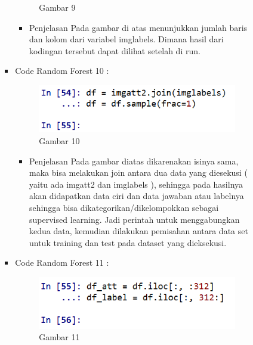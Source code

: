 \begin{enumerate}
\begin{itemize}
\begin{itemize}
\begin{itemize}
\begin{figure}[ht]
\caption{Gambar 9}
\label{contoh}
\end{figure}
\par
\begin{itemize}
\item Penjelasan  Pada gambar di atas menunjukkan jumlah baris dan kolom dari variabel imglabels. Dimana hasil dari kodingan tersebut dapat dilihat setelah di run. 
\par
\par
\end{itemize}
\item Code Random Forest 10 :
\par
\begin{figure}[ht]
\centering
\includegraphics[scale=0.7]{figures/andi/RF10.PNG}
\caption{Gambar 10}
\label{contoh}
\end{figure}
\par
\begin{itemize}
\item Penjelasan  Pada gambar diatas dikarenakan isinya sama, maka bisa melakukan join antara dua data yang diesekusi ( yaitu ada imgatt2 dan imglabels ), sehingga pada hasilnya akan didapatkan data ciri dan data jawaban atau labelnya sehingga bisa dikategorikan/dikelompokkan sebagai supervised learning. Jadi perintah untuk menggabungkan kedua data, kemudian dilakukan pemisahan antara data set untuk training dan test pada dataset yang dieksekusi.
\par
\par
\end{itemize}
\item Code Random Forest 11 :
\par
\begin{figure}[ht]
\centering
\includegraphics[scale=0.7]{figures/andi/RF11.PNG}
\caption{Gambar 11}
\label{contoh}
\end{figure}
\par

\end{itemize}
\end{itemize}
\end{itemize}
\end{enumerate}
